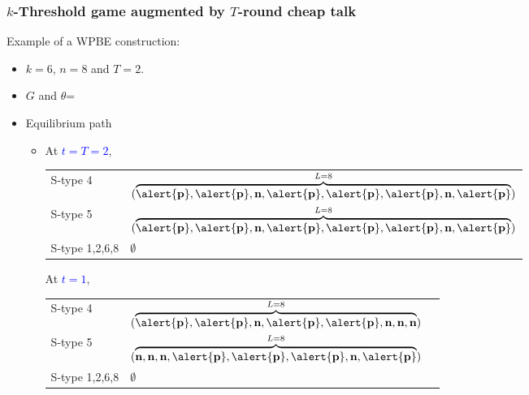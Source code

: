 \documentclass[9pt,handout]{beamer}
\begin{document}
\begin{frame}
  \frametitle{$k$-Threshold game augmented by $T$-round cheap talk}
Example of a WPBE construction:
\begin{itemize}
\item $k=6$, $n=8$ and $T=2$.
\item $G$ and $\theta$=
\begin{center}
\end{center}
\end{itemize}

\begin{itemize}
\item Equilibrium path
\begin{itemize}
\item 
{}
{
At \textcolor{blue}{$t=T=2$}, 
\begin{table}[h]
\begin{tabular}{ll }
S-type 4 & $(\overbrace{\alert{\textbf{p}},\alert{\textbf{p}},\textbf{n},\alert{\textbf{p}},\alert{\textbf{p}},\alert{\textbf{p}},\textbf{n},\alert{\textbf{p}}}^{L=8})$\\
S-type 5 & $(\overbrace{\alert{\textbf{p}},\alert{\textbf{p}},\textbf{n},\alert{\textbf{p}},\alert{\textbf{p}},\alert{\textbf{p}},\textbf{n},\alert{\textbf{p}}}^{L=8})$\\
S-type 1,2,6,8 & $\emptyset$
\end{tabular}
\end{table}
}
{
At \textcolor{blue}{$t=1$}, 
\begin{table}[h]
\begin{tabular}{ll l}
S-type 4 & $(\overbrace{\alert{\textbf{p}},\alert{\textbf{p}},\textbf{n},\alert{\textbf{p}},\alert{\textbf{p}},\textbf{n},\textbf{n},\textbf{n}}^{L=8})$\\
S-type 5 & $(\overbrace{\textbf{n},\textbf{n},\textbf{n},\alert{\textbf{p}},\alert{\textbf{p}},\alert{\textbf{p}},\textbf{n},\alert{\textbf{p}}}^{L=8})$ \\
S-type 1,2,6,8 & $\emptyset$
\end{tabular}
\end{table}
}


\end{itemize}
\end{itemize}
\end{frame}
\end{document}
